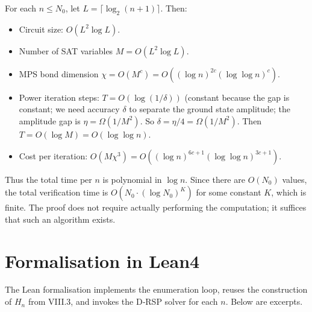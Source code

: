 \documentclass[11pt,a4paper]{article}
\begin{document}
For each \(n \le N_0\), let \(L = \lceil \log_2 (n+1)\rceil\). Then:
\begin{itemize}
\item Circuit size: \(O(L^2 \log L)\).
\item Number of SAT variables \(M = O(L^2 \log L)\).
\item MPS bond dimension \(\chi = O(M^c) = O((\log n)^{2c} (\log \log n)^c)\).
\item Power iteration steps: \(T = O(\log(1/\delta))\) (constant because the gap is constant; we need accuracy \(\delta\) to separate the ground state amplitude; the amplitude gap is \(\eta = \Omega(1/M^2)\). So \(\delta = \eta/4 = \Omega(1/M^2)\). Then \(T = O(\log M) = O(\log \log n)\).
\item Cost per iteration: \(O(M\chi^3) = O((\log n)^{6c+1} (\log \log n)^{3c+1})\).
\end{itemize}
Thus the total time per \(n\) is polynomial in \(\log n\). Since there are \(O(N_0)\) values, the total verification time is \(O(N_0 \cdot (\log N_0)^K)\) for some constant \(K\), which is finite. The proof does not require actually performing the computation; it suffices that such an algorithm exists.

\section{Formalisation in Lean4}

The Lean formalisation implements the enumeration loop, reuses the construction of \(H_n\) from VIII.3, and invokes the D‑RSP solver for each \(n\). Below are excerpts.
\end{document}
